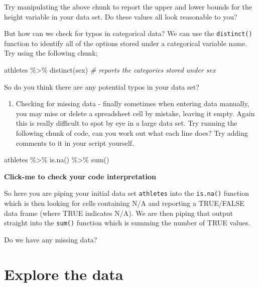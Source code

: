 \documentclass[
]{book}
\newenvironment{Shaded}{\begin{snugshade}}{\end{snugshade}}
\newcommand{\CommentTok}[1]{\textcolor[rgb]{0.56,0.35,0.01}{\textit{#1}}}
\newcommand{\FunctionTok}[1]{\textcolor[rgb]{0.00,0.00,0.00}{#1}}
\newcommand{\NormalTok}[1]{#1}
\newcommand{\SpecialCharTok}[1]{\textcolor[rgb]{0.00,0.00,0.00}{#1}}
\providecommand{\tightlist}{%
  \setlength{\itemsep}{0pt}\setlength{\parskip}{0pt}}
\begin{document}
Try manipulating the above chunk to report the upper and lower bounds for the height variable in your data set. Do these values all look reasonable to you?

But how can we check for typos in categorical data? We can use the \texttt{distinct()} function to identify all of the options stored under a categorical variable name. Try using the following chunk;

\begin{Shaded}
\begin{Highlighting}[]
\NormalTok{athletes }\SpecialCharTok{\%\textgreater{}\%} 
  \FunctionTok{distinct}\NormalTok{(sex) }\CommentTok{\# reports the categories stored under sex}
\end{Highlighting}
\end{Shaded}

So do you think there are any potential typos in your data set?

\begin{enumerate}
\def\labelenumi{\arabic{enumi})}
\setcounter{enumi}{2}
\tightlist
\item
  Checking for missing data - finally sometimes when entering data manually, you may miss or delete a spreadsheet cell by mistake, leaving it empty. Again this is really difficult to spot by eye in a large data set. Try running the following chunk of code, can you work out what each line does? Try adding comments to it in your script yourself.
\end{enumerate}

\begin{Shaded}
\begin{Highlighting}[]
\NormalTok{athletes }\SpecialCharTok{\%\textgreater{}\%} 
  \FunctionTok{is.na}\NormalTok{() }\SpecialCharTok{\%\textgreater{}\%} 
  \FunctionTok{sum}\NormalTok{()}
\end{Highlighting}
\end{Shaded}

\textbf{Click-me to check your code interpretation}

So here you are piping your initial data set \texttt{athletes} into the \texttt{is.na()} function which is then looking for cells containing N/A and reporting a TRUE/FALSE data frame (where TRUE indicates N/A). We are then piping that output straight into the \texttt{sum()} function which is summing the number of TRUE values.

Do we have any missing data?

\hypertarget{explore-the-data}{%
\section{Explore the data}\label{explore-the-data}}
\end{document}
